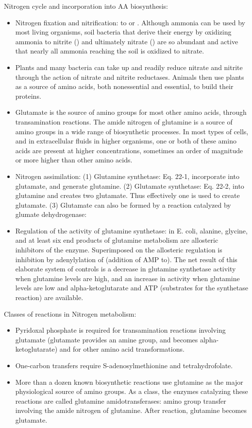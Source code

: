 \documentclass{report}
\begin{document}
\begin{enumerate}
Nitrogen cycle and incorporation into AA biosynthesis: 
\begin{itemize}
	\item Nitrogen fixation and nitrification:  to  or . Although ammonia can be used by most living organisms, soil bacteria that derive their energy by oxidizing ammonia to nitrite () and ultimately nitrate () are so abundant and active that nearly all ammonia reaching the soil is oxidized to nitrate.
	\item Plants and many bacteria can take up and readily reduce nitrate and nitrite through the action of nitrate and nitrite reductases. Animals then use plants as a source of amino acids, both nonessential and essential, to build their proteins.
	\item Glutamate is the source of amino groups for most other amino acids, through transamination reactions. The amide nitrogen of glutamine is a source of amino groups in a wide range of biosynthetic processes. In most types of cells, and in extracellular fluids in higher organisms, one or both of these amino acids are present at higher concentrations, sometimes an order of magnitude or more higher than other amino acids.
	\item Nitrogen assimilation: (1) Glutamine synthetase: Eq. 22-1, incorporate  into glutamate, and generate glutamine. (2) Glutamate synthetase: Eq. 22-2,  into glutamine and creates two glutamate. Thus effectively one  is used to create glutamate. (3) Glutamate can also be formed by a reaction catalyzed by glumate dehydrogenase: 
	\item Regulation of the activity of glutamine synthetase: in E. coli, alanine, glycine, and at least six end products of glutamine metabolism are allosteric inhibitors of the enzyme. Superimposed on the allosteric regulation is inhibition by adenylylation of (addition of AMP to). The net result of this elaborate system of controls is a decrease in glutamine synthetase activity when glutamine levels are high, and an increase in activity when glutamine levels are low and alpha-ketoglutarate and ATP (substrates for the synthetase reaction) are available.
\end{itemize}
		
Classes of reactions in Nitrogen metabolism:
\begin{itemize}
	\item Pyridoxal phosphate is required for transamination reactions involving glutamate (glutamate provides an amine group, and becomes alpha-ketoglutarate) and for other amino acid transformations. 
	\item One-carbon transfers require S-adenosylmethionine and tetrahydrofolate.
	\item More than a dozen known biosynthetic reactions use glutamine as the major physiological source of amino groups. As a class, the enzymes catalyzing these reactions are called glutamine amidotransferases: amino group transfer involving the amide nitrogen of glutamine. After reaction, glutamine becomes glutamate.
\end{itemize}
		

\end{enumerate}
\end{document}
